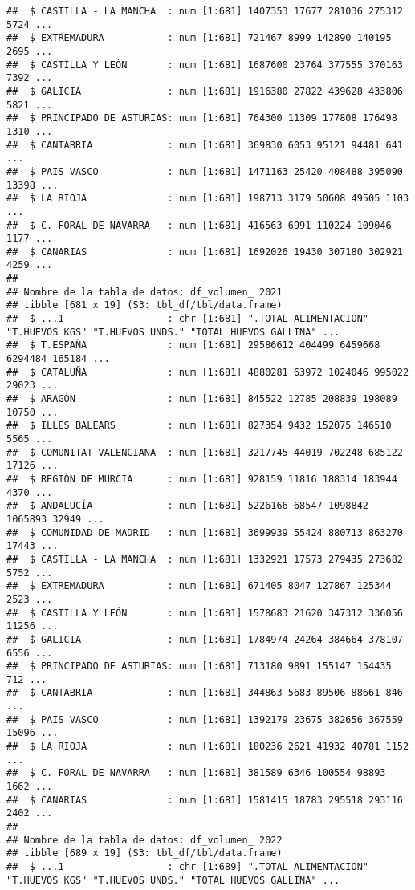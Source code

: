 \documentclass[
]{article}
\begin{document}
\begin{verbatim}
##  $ CASTILLA - LA MANCHA  : num [1:681] 1407353 17677 281036 275312 5724 ...
##  $ EXTREMADURA           : num [1:681] 721467 8999 142890 140195 2695 ...
##  $ CASTILLA Y LEÓN       : num [1:681] 1687600 23764 377555 370163 7392 ...
##  $ GALICIA               : num [1:681] 1916380 27822 439628 433806 5821 ...
##  $ PRINCIPADO DE ASTURIAS: num [1:681] 764300 11309 177808 176498 1310 ...
##  $ CANTABRIA             : num [1:681] 369830 6053 95121 94481 641 ...
##  $ PAIS VASCO            : num [1:681] 1471163 25420 408488 395090 13398 ...
##  $ LA RIOJA              : num [1:681] 198713 3179 50608 49505 1103 ...
##  $ C. FORAL DE NAVARRA   : num [1:681] 416563 6991 110224 109046 1177 ...
##  $ CANARIAS              : num [1:681] 1692026 19430 307180 302921 4259 ...
##  
## Nombre de la tabla de datos: df_volumen_ 2021 
## tibble [681 x 19] (S3: tbl_df/tbl/data.frame)
##  $ ...1                  : chr [1:681] ".TOTAL ALIMENTACION" "T.HUEVOS KGS" "T.HUEVOS UNDS." "TOTAL HUEVOS GALLINA" ...
##  $ T.ESPAÑA              : num [1:681] 29586612 404499 6459668 6294484 165184 ...
##  $ CATALUÑA              : num [1:681] 4880281 63972 1024046 995022 29023 ...
##  $ ARAGÓN                : num [1:681] 845522 12785 208839 198089 10750 ...
##  $ ILLES BALEARS         : num [1:681] 827354 9432 152075 146510 5565 ...
##  $ COMUNITAT VALENCIANA  : num [1:681] 3217745 44019 702248 685122 17126 ...
##  $ REGIÓN DE MURCIA      : num [1:681] 928159 11816 188314 183944 4370 ...
##  $ ANDALUCÍA             : num [1:681] 5226166 68547 1098842 1065893 32949 ...
##  $ COMUNIDAD DE MADRID   : num [1:681] 3699939 55424 880713 863270 17443 ...
##  $ CASTILLA - LA MANCHA  : num [1:681] 1332921 17573 279435 273682 5752 ...
##  $ EXTREMADURA           : num [1:681] 671405 8047 127867 125344 2523 ...
##  $ CASTILLA Y LEÓN       : num [1:681] 1578683 21620 347312 336056 11256 ...
##  $ GALICIA               : num [1:681] 1784974 24264 384664 378107 6556 ...
##  $ PRINCIPADO DE ASTURIAS: num [1:681] 713180 9891 155147 154435 712 ...
##  $ CANTABRIA             : num [1:681] 344863 5683 89506 88661 846 ...
##  $ PAIS VASCO            : num [1:681] 1392179 23675 382656 367559 15096 ...
##  $ LA RIOJA              : num [1:681] 180236 2621 41932 40781 1152 ...
##  $ C. FORAL DE NAVARRA   : num [1:681] 381589 6346 100554 98893 1662 ...
##  $ CANARIAS              : num [1:681] 1581415 18783 295518 293116 2402 ...
##  
## Nombre de la tabla de datos: df_volumen_ 2022 
## tibble [689 x 19] (S3: tbl_df/tbl/data.frame)
##  $ ...1                  : chr [1:689] ".TOTAL ALIMENTACION" "T.HUEVOS KGS" "T.HUEVOS UNDS." "TOTAL HUEVOS GALLINA" ...

\end{verbatim}
\end{document}
